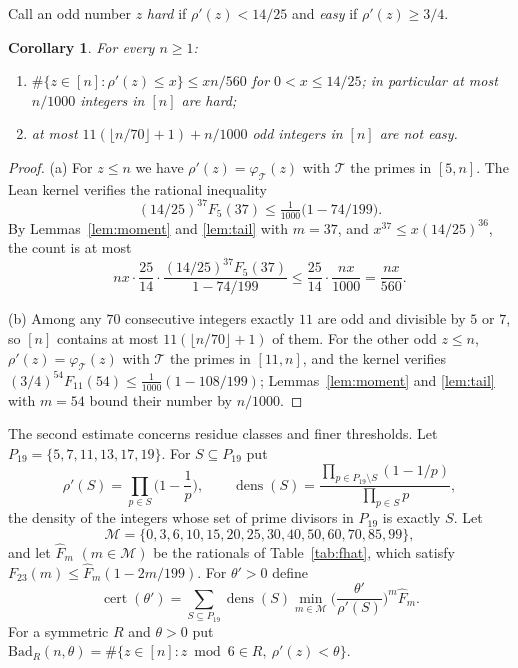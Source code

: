 \documentclass[11pt,a4paper]{article}
\newtheorem{corollary}[theorem]{Corollary}
\theoremstyle{definition}
\theoremstyle{remark}
\newcommand{\cert}{\operatorname{cert}}
\begin{document}
Call an odd number $z$ \emph{hard} if $\rho'(z)<14/25$ and \emph{easy} if $\rho'(z)\ge3/4$.

\begin{corollary}\label{cor:hard}
For every $n\ge1$:
\begin{enumerate}[label=(\alph*), nosep]
\item $\#\{z\in[n]:\rho'(z)\le x\}\le xn/560$ for $0<x\le14/25$; in particular at most $n/1000$
integers in $[n]$ are hard;
\item at most $11(\lfloor n/70\rfloor+1)+n/1000$ odd integers in $[n]$ are not easy.
\end{enumerate}
\end{corollary}

\begin{proof}
(a) For $z\le n$ we have $\rho'(z)=\varphi_\mathcal{T}(z)$ with $\mathcal{T}$ the primes in $[5,n]$.
The Lean kernel verifies the rational inequality
\begin{equation}\label{eq:F5}
  (14/25)^{37}F_5(37)\le\tfrac1{1000}\big(1-74/199\big).
\end{equation}
By Lemmas~\ref{lem:moment} and \ref{lem:tail} with $m=37$, and $x^{37}\le x(14/25)^{36}$, the count
is at most
\[
  nx\cdot\frac{25}{14}\cdot\frac{(14/25)^{37}F_5(37)}{1-74/199}\le\frac{25}{14}\cdot\frac{nx}{1000}
  =\frac{nx}{560}.
\]

(b) Among any $70$ consecutive integers exactly $11$ are odd and divisible by $5$ or $7$, so $[n]$
contains at most $11(\lfloor n/70\rfloor+1)$ of them. For the other odd $z\le n$,
$\rho'(z)=\varphi_\mathcal{T}(z)$ with $\mathcal{T}$ the primes in $[11,n]$, and the kernel verifies
$(3/4)^{54}F_{11}(54)\le\frac1{1000}(1-108/199)$; Lemmas~\ref{lem:moment} and \ref{lem:tail} with
$m=54$ bound their number by $n/1000$.
\end{proof}

The second estimate concerns residue classes and finer thresholds. Let
$P_{19}=\{5,7,11,13,17,19\}$. For $S\subseteq P_{19}$ put
\[
  \rho'(S)=\prod_{p\in S}\Big(1-\frac1p\Big),\qquad
  \operatorname{dens}(S)=\frac{\prod_{p\in P_{19}\setminus S}(1-1/p)}{\prod_{p\in S}p},
\]
the density of the integers whose set of prime divisors in $P_{19}$ is exactly $S$. Let
\[
  \mathcal{M}=\{0,3,6,10,15,20,25,30,40,50,60,70,85,99\},
\]
and let $\hat F_m$ $(m\in\mathcal{M})$ be the rationals of Table~\ref{tab:fhat}, which satisfy
$F_{23}(m)\le\hat F_m(1-2m/199)$. For
$\theta'>0$ define
\[
  \cert(\theta')=\sum_{S\subseteq P_{19}}\operatorname{dens}(S)\min_{m\in\mathcal{M}}
  \Big(\frac{\theta'}{\rho'(S)}\Big)^m\hat F_m .
\]
For a symmetric $R$ and $\theta>0$ put $\mathrm{Bad}_R(n,\theta)=\#\{z\in[n]:z\bmod6\in R,\ \rho'(z)
<\theta\}$.
\end{document}

